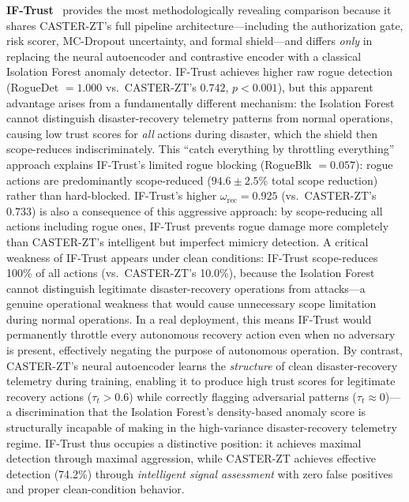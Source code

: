 \documentclass[10pt,journal,compsoc]{IEEEtran}
\begin{document}
\noindent\textbf{IF-Trust}~\cite{zahoor2025ifocsvm} provides the most methodologically revealing comparison because it shares CASTER-ZT's full pipeline architecture---including the authorization gate, risk scorer, MC-Dropout uncertainty, and formal shield---and differs \emph{only} in replacing the neural autoencoder and contrastive encoder with a classical Isolation Forest anomaly detector.
IF-Trust achieves higher raw rogue detection (RogueDet $= 1.000$ vs.\ CASTER-ZT's $0.742$, $p < 0.001$), but this apparent advantage arises from a fundamentally different mechanism: the Isolation Forest cannot distinguish disaster-recovery telemetry patterns from normal operations, causing low trust scores for \emph{all} actions during disaster, which the shield then scope-reduces indiscriminately.
This ``catch everything by throttling everything'' approach explains IF-Trust's limited rogue blocking (RogueBlk $= 0.057$): rogue actions are predominantly scope-reduced ($94.6\pm2.5$\% total scope reduction) rather than hard-blocked.
IF-Trust's higher $\omega_{\mathrm{rec}} = 0.925$ (vs.\ CASTER-ZT's $0.733$) is also a consequence of this aggressive approach: by scope-reducing all actions including rogue ones, IF-Trust prevents rogue damage more completely than CASTER-ZT's intelligent but imperfect mimicry detection.
A critical weakness of IF-Trust appears under clean conditions: IF-Trust scope-reduces 100\% of all actions (vs.\ CASTER-ZT's 10.0\%), because the Isolation Forest cannot distinguish legitimate disaster-recovery operations from attacks---a genuine operational weakness that would cause unnecessary scope limitation during normal operations.
In a real deployment, this means IF-Trust would permanently throttle every autonomous recovery action even when no adversary is present, effectively negating the purpose of autonomous operation.
By contrast, CASTER-ZT's neural autoencoder learns the \emph{structure} of clean disaster-recovery telemetry during training, enabling it to produce high trust scores for legitimate recovery actions ($\tau_t > 0.6$) while correctly flagging adversarial patterns ($\tau_t \approx 0$)---a discrimination that the Isolation Forest's density-based anomaly score is structurally incapable of making in the high-variance disaster-recovery telemetry regime.
IF-Trust thus occupies a distinctive position: it achieves maximal detection through maximal aggression, while CASTER-ZT achieves effective detection (74.2\%) through \emph{intelligent signal assessment} with zero false positives and proper clean-condition behavior.
\end{document}
